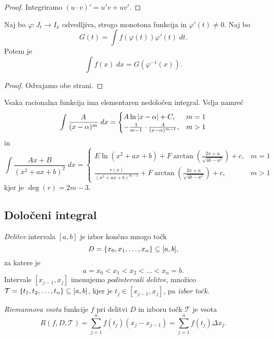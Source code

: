 \documentclass[12pt, a4paper]{article}
\begin{document}
\begin{proof}
Integriramo $(u\cdot v)'=u'v+uv'$.
\end{proof}

\begin{trditev}
Naj bo $\varphi\colon J_t\to I_x$ odvedljiva, strogo monotona funkcija in $\varphi'(t)\ne 0$. Naj bo
\[
G(t) = \int f(\varphi(t))\varphi'(t)\;dt.
\]
Potem je
\[
\int f(x)\;dx = G(\varphi^{-1}(x)).
\]
\end{trditev}

\begin{proof}
Odvajamo obe strani.
\end{proof}

\begin{opomba}
Vsaka racionalna funkcija ima elementaren nedoločen integral. Velja namreč
\[
\int\frac{A}{(x-\alpha)^m}\;dx=\begin{cases}
A\ln\left\lvert x-\alpha\right\rvert+C, & m=1 \\
-\frac{1}{m-1}\cdot\frac{A}{(x-\alpha)^{m-1}}, & m>1
\end{cases}
\]
in
\[
\int \frac{Ax+B}{(x^2+ax+b)^2}\;dx = \begin{cases}
E\ln(x^2+ax+b)+F\arctan\left(\frac{2x+a}{\sqrt{4b-a^2}}\right)+c, & m=1 \\
\frac{r(x)}{(x^2+ax+b)^{m-1}}+F\arctan\left(\frac{2x+a}{\sqrt{4b-a^2}}\right)+c, & m>1
\end{cases}
\]
kjer je $\deg(r)=2m-3$.
\end{opomba}

\newpage

\subsection{Določeni integral}

\begin{definicija}
\emph{Delitev} intervala $[a,b]$ je izbor končno mnogo točk
\[
D=\left\{x_0,x_1,\dots,x_n\right\}\subseteq[a,b],
\]
za katere je
\[
a=x_0<x_1<x_2<\dots<x_n=b.
\]
Intervale $[x_{j-1},x_j]$ imenujemo \emph{podintervali delitve}, množico $\mathcal{T}=\left\{t_1,t_2,\dots,t_n\right\}\subseteq[a,b]$, kjer je $t_j\in[x_{j-1},x_j]$, pa \emph{izbor točk}.
\end{definicija}

\begin{definicija}
\emph{Riemannova vsota} funkcije $f$ pri delitvi $D$ in izboru točk $\mathcal{T}$ je vsota
\[
R(f,D,\mathcal{T})=\sum_{j=1}^n f(t_j)(x_j-x_{j-1})=\sum_{j=1}^n f(t_j)\Delta x_j.
\]
\end{definicija}
\end{document}
